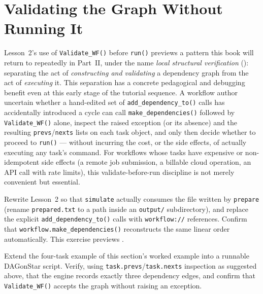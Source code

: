 \section{Validating the Graph Without Running It}

Lesson~2's use of \texttt{Validate\_WF()} before \texttt{run()} previews a
pattern this book will return to repeatedly in Part~II, under the name
\emph{local structural verification} (): separating the
act of \emph{constructing and validating} a dependency graph from the act of
\emph{executing} it. This separation has a concrete pedagogical and
debugging benefit even at this early stage of the tutorial sequence. A
workflow author uncertain whether a hand-edited set of
\texttt{add\_dependency\_to()} calls has accidentally introduced a cycle can
call \texttt{make\_dependencies()} followed by \texttt{Validate\_WF()} alone,
inspect the raised exception (or its absence) and the resulting
\texttt{prevs}/\texttt{nexts} lists on each task object, and only then decide
whether to proceed to \texttt{run()} --- without incurring the cost, or the
side effects, of actually executing any task's command. For workflows whose
tasks have expensive or non-idempotent side effects (a remote job
submission, a billable cloud operation, an API call with rate limits), this
validate-before-run discipline is not merely convenient but essential.

\begin{exercise}
Rewrite Lesson~2 so that \texttt{simulate} actually consumes the file written
by \texttt{prepare} (rename \texttt{prepared.txt} to a path inside an
\texttt{output/} subdirectory), and replace the explicit
\texttt{add\_dependency\_to()} calls with \texttt{workflow://} references.
Confirm that \texttt{workflow.make\_dependencies()} reconstructs the same
linear order automatically. This exercise previews .
\end{exercise}

\begin{exercise}
Extend the four-task example of this section's worked example into a
runnable DAGonStar script. Verify, using
\texttt{task.prevs}/\texttt{task.nexts} inspection as suggested above, that
the engine records exactly three dependency edges, and confirm that
\texttt{Validate\_WF()} accepts the graph without raising an exception.
\end{exercise}
